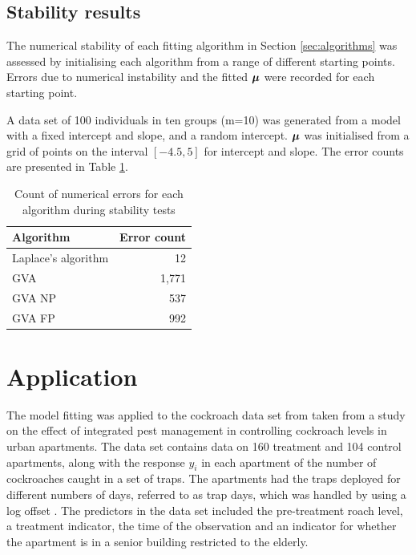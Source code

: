 \documentclass{article}[12pt]
\begin{document}

\subsection{Stability results}

The numerical stability of each fitting algorithm in Section \ref{sec:algorithms} was assessed by initialising
each algorithm from a range of different starting points. Errors due to numerical instability and the fitted
${\boldsymbol \mu}$ were recorded for each starting point.

A data set of 100 individuals in ten groups (m=10) was generated from a model with a fixed intercept
and slope, and a random intercept. ${\boldsymbol \mu}$ was initialised from a grid of points on the interval
$[-4.5, 5]$ for intercept and slope. The error counts are presented in Table
\ref{tab:stability_results}.

\begin{table}
\caption{Count of numerical errors for each algorithm during stability tests}
\label{tab:stability_results}
\begin{tabular}{|l|r|}
\hline
Algorithm & Error count \\
\hline
Laplace's algorithm & 12 \\
GVA & 1,771 \\
GVA NP & 537 \\
GVA FP & 992 \\
\hline
\end{tabular}
\end{table}

\section{Application}
\label{sec:application}


The model fitting was applied to the cockroach data set from \cite{Gelman2007} taken from a study on the
effect of integrated pest management in controlling cockroach levels in urban apartments. The data set
contains data on 160 treatment and 104 control apartments, along with the response $y_i$ in each apartment of
the number of cockroaches caught in a set of traps. The apartments had the traps deployed for different
numbers of days, referred to as trap days, which was handled by using a log offset \cite{Agresti2002}. The
predictors in the data set included the pre-treatment roach level, a treatment indicator, the time of the
observation and an indicator for whether the apartment is in a senior building restricted to the elderly.
\end{document}
